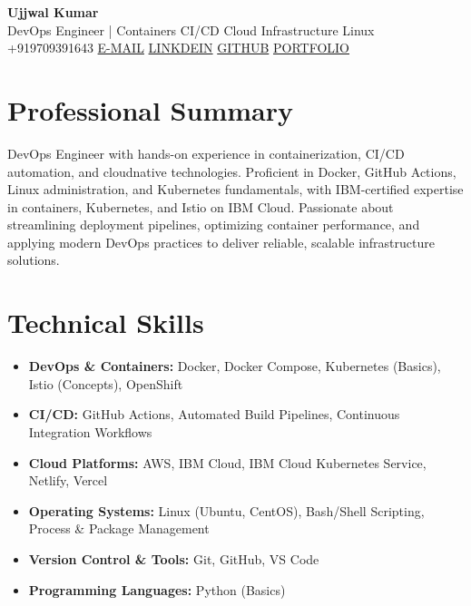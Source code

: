 \documentclass[10pt, letterpaper]{article}
\begin{document}
\begin{center}
 {\LARGE \textbf{Ujjwal Kumar}} \\[3pt]
 {\normalsize DevOps Engineer | Containers \textbar{} CI/CD \textbar{} Cloud Infrastructure \textbar{} Linux} \\[4pt]
 {\small +919709391643 \textbar{}
 \href{mailto:iamkashyup@gmail.com}{E-MAIL} \textbar{}
 \href{https://www.linkedin.com/in/uxzwal}{LINKDEIN} \textbar{}
 \href{https://github.com/uxzwal}{GITHUB}} \textbar{}
 \href{https://uxzwal.github.io/uzxwal}{PORTFOLIO}
\end{center}
\section{Professional Summary}
DevOps Engineer with hands-on experience in containerization, CI/CD automation, and cloudnative technologies. Proficient in Docker, GitHub Actions, Linux administration, and Kubernetes fundamentals, with IBM-certified expertise in containers, Kubernetes, and Istio on IBM Cloud. Passionate about streamlining deployment pipelines, optimizing container performance, and applying modern DevOps practices to deliver reliable, scalable infrastructure solutions.
\section{Technical Skills}
\begin{itemize}[noitemsep, topsep=2pt, leftmargin=0pt, label={}]
 \item \textbf{DevOps \& Containers:} Docker, Docker Compose, Kubernetes (Basics), Istio (Concepts), OpenShift
 \item \textbf{CI/CD:} GitHub Actions, Automated Build Pipelines, Continuous Integration Workflows
 \item \textbf{Cloud Platforms:} AWS, IBM Cloud, IBM Cloud Kubernetes Service, Netlify, Vercel
 \item \textbf{Operating Systems:} Linux (Ubuntu, CentOS), Bash/Shell Scripting, Process \& Package Management
 \item \textbf{Version Control \& Tools:} Git, GitHub, VS Code
 \item \textbf{Programming Languages:} Python (Basics)
\end{itemize}
\end{document}
